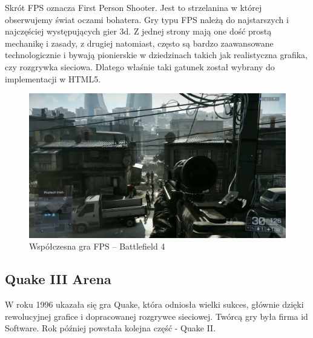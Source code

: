 Skrót FPS oznacza First Person Shooter. Jest to strzelanina w której obserwujemy świat
oczami bohatera. Gry typu FPS należą do najstarszych i najczęściej występujących gier
3d. Z jednej strony mają one dość prostą mechanikę i zasady, z drugiej natomiast, często
są bardzo zaawansowane technologicznie i bywają pionierskie w dziedzinach takich jak
realistyczna grafika, czy rozgrywka sieciowa. Dlatego właśnie taki gatunek został wybrany
do implementacji w HTML5.

\begin{figure}[h]
  \centering
  \includegraphics[scale=0.25]{zasoby/rozdzial2/battlefield4}  
  \caption{Współczesna gra FPS -- Battlefield 4}
  \label{fig:battlefield4}
\end{figure}

\subsection{Quake III Arena}
\label{ssec:quake3}

W roku 1996 ukazała się gra Quake, która odniosła wielki sukces, głównie dzięki
rewolucyjnej grafice i dopracowanej rozgrywce sieciowej. Twórcą gry była firma
id Software. Rok później powstała kolejna część - Quake II.

